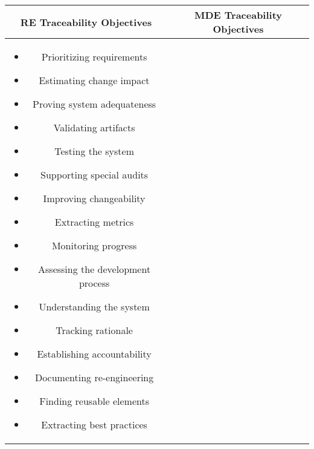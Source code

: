 \begin{tabular}{|c|c|}
\hline
\begin{minipage}[t][][c]{0.5\textwidth}
\centering
\textbf{RE Traceability Objectives}
\end{minipage}

&

\begin{minipage}[t][][c]{0.5\textwidth}
\centering
\textbf{MDE Traceability Objectives}
\end{minipage}

\\\hline

\begin{minipage}[t][][c]{0.5\textwidth}
\vspace{0.1cm}
\begin{itemize}
\renewcommand{\labelitemi}{$\bullet$}

\item Prioritizing requirements 
\item Estimating change impact 
\item Proving system adequateness 
\item Validating artifacts 
\item Testing the system 
\item Supporting special audits 
\item Improving changeability 
\item Extracting metrics 
\item Monitoring progress 
\item Assessing the development process
\item Understanding the system 
\item Tracking rationale 
\item Establishing accountability 
\item Documenting re-engineering 
\item Finding reusable elements 
\item Extracting best practices 

\end{itemize}
\vspace{0.1cm}
\end{minipage}

&

\begin{minipage}[t][][c]{0.5\textwidth}
\vspace{0.1cm}
\begin{itemize}
\renewcommand{\labelitemi}{$\bullet$}


\end{itemize}
\end{minipage}
\end{tabular}
